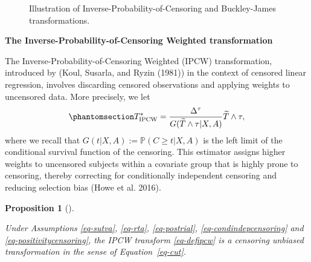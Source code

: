\documentclass[
  11pt,
  a4paper,
]{article}
\theoremstyle{plain}
\theoremstyle{plain}
\theoremstyle{plain}
\newtheorem{proposition}{Proposition}[section]
\theoremstyle{definition}
\theoremstyle{remark}
\begin{document}
\begin{figure}


\caption{\label{fig-trans}Illustration of
Inverse-Probability-of-Censoring and Buckley-James transformations.}

\end{figure}%

\textbf{The Inverse-Probability-of-Censoring Weighted transformation}

The Inverse-Probability-of-Censoring Weighted (IPCW) transformation,
introduced by (Koul, Susarla, and Ryzin (1981)) in the context of
censored linear regression, involves discarding censored observations
and applying weights to uncensored data. More precisely, we let
\begin{equation}\phantomsection\label{eq-defipcw}{
T^*_{\mathrm{IPCW}}=\frac{\Delta^\tau}{G(\widetilde{T}\wedge \tau|X,A)} \widetilde{T} \wedge \tau,
}\end{equation} where we recall that
\(G(t|X,A) :=\mathbb{P}(C \geqslant t|X,A)\) is the left limit of the
conditional survival function of the censoring. This estimator assigns
higher weights to uncensored subjects within a covariate group that is
highly prone to censoring, thereby correcting for conditionally
independent censoring and reducing selection bias (Howe et al. 2016).

\begin{proposition}[]\protect\hypertarget{prp-ipcw}{}\label{prp-ipcw}

Under Assumptions
\ref{eq-sutva}, \ref{eq-rta}, \ref{eq-postrial}, \ref{eq-condindepcensoring}
and \ref{eq-positivitycensoring}, the IPCW transform \ref{eq-defipcw} is
a censoring unbiased transformation in the sense of
Equation~\ref{eq-cut}.

\end{proposition}
\end{document}
